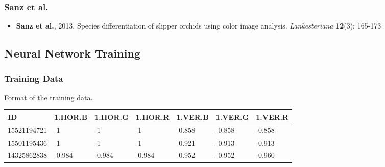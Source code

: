 \documentclass[]{beamer}
\begin{document}
    \begin{frame}
        \frametitle{Sanz et al.}

        \begin{itemize}
            \item \textbf{Sanz et al.}, 2013. Species differentiation of
            slipper orchids using color image analysis.
            \textit{Lankesteriana} \textbf{12}(3): 165-173
        \end{itemize}
    \end{frame}

    \subsection{Neural Network Training}

    \begin{frame}
        \frametitle{Training Data}

        Format of the training data.

        \begin{table}[h]\scriptsize
            \begin{center}
            \begin{tabular}{lllllll}
            \toprule
            ID & 1.HOR.B & 1.HOR.G & 1.HOR.R & 1.VER.B & 1.VER.G & 1.VER.R \\
            \midrule
            15521194721 & -1 & -1 & -1 & -0.858 & -0.858 & -0.858 \\
            15501195436 & -1 & -1 & -1 & -0.921 & -0.913 & -0.913 \\
            14325862838 & -0.984 & -0.984 & -0.984 & -0.952 & -0.952 & -0.960 \\
            \bottomrule
            \end{tabular}
            \end{center}
        \end{table}
    \end{frame}
\end{document}

